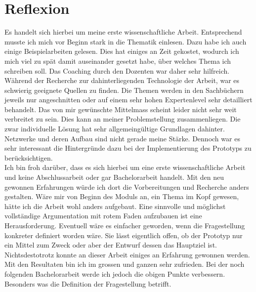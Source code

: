 \chapter{Reflexion}
Es handelt sich hierbei um meine erste wissenschaftliche Arbeit. 
Entsprechend musste ich mich vor Beginn stark in die Thematik einlesen. Dazu habe ich auch einige Beispielarbeiten gelesen.
Dies hat einiges an Zeit gekostet, wodurch ich mich viel zu spät damit auseinander gesetzt habe, 
über welches Thema ich schreiben soll. Das Coaching durch den Dozenten war daher sehr hilfreich. 
Während der Recherche zur dahinterliegenden Technologie der Arbeit, war es schwierig geeignete Quellen zu finden.
Die Themen werden in den Sachbüchern jeweils nur angeschnitten oder auf einem sehr hohen Expertenlevel sehr detailliert behandelt.
Das von mir gewünschte Mittelmass scheint leider nicht sehr weit verbreitet zu sein.
Dies kann an meiner Problemstellung zusammenliegen. Die zwar individuelle Lösung hat sehr allgemeingültige Grundlagen dahinter.
Netzwerke und deren Aufbau sind nicht gerade meine Stärke. 
Dennoch war es sehr interessant die Hintergründe dazu bei der Implementierung des Prototyps zu berücksichtigen.
\\
Ich bin froh darüber, dass es sich hierbei um eine erste wissenschaftliche Arbeit und keine Abschlussarbeit oder gar Bachelorarbeit handelt.
Mit den neu gewonnen Erfahrungen würde ich dort die Vorbereitungen und Recherche anders gestalten. 
Wäre mir von Beginn des Moduls an, ein Thema im Kopf gewesen, hätte ich die Arbeit wohl anders aufgebaut. 
Eine sinnvolle und möglichst vollständige Argumentation mit rotem Faden aufzubauen ist eine Herausforderung. 
Eventuell wäre es einfacher geworden, wenn die Fragestellung konkreter definiert worden wäre. 
Sie lässt eigentlich offen, ob der Prototyp nur ein Mittel zum Zweck oder aber der Entwurf dessen das Hauptziel ist. 
\\
Nichtsdestotrotz konnte an dieser Arbeit einiges an Erfahrung gewonnen werden. Mit den Resultaten bin ich im grossen und ganzen sehr zufrieden.
Bei der noch folgenden Bachelorarbeit werde ich jedoch die obigen Punkte verbessern. Besonders was die Definition der Fragestellung betrifft.

